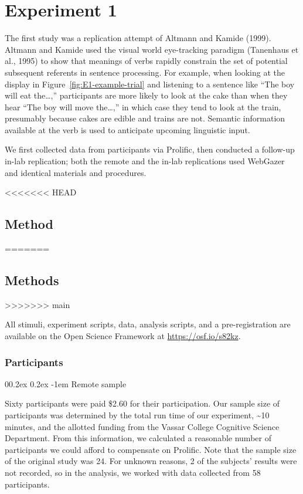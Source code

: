 \documentclass[
  man,floatsintext]{apa6}
\makeatletter
\let\oldparagraph\paragraph
\renewcommand{\paragraph}[1]{\oldparagraph{#1}\mbox{}}
\renewcommand{\paragraph}{\@startsection{paragraph}{4}{\parindent}%
  {0\baselineskip \@plus 0.2ex \@minus 0.2ex}%
  {-1em}%
  {\normalfont\normalsize\bfseries\itshape\typesectitle}}
\makeatother
\begin{document}
\section{Experiment 1}\label{experiment-1}

The first study was a replication attempt of
Altmann and Kamide (1999). Altmann and Kamide used the
visual world eye-tracking paradigm (Tanenhaus et al., 1995) to show that
meanings of verbs rapidly constrain the set of potential subsequent
referents in sentence processing. For example, when looking at the
display in Figure~\ref{fig:E1-example-trial} and listening to a sentence like
``The boy will eat the\ldots,'' participants are more likely to look at the cake than
when they hear ``The boy will move the\ldots,'' in which case they tend to look at the
train, presumably because cakes are edible and trains are not. Semantic
information available at the verb is used to anticipate upcoming
linguistic input.

We first collected data from participants via Prolific, then conducted a follow-up in-lab replication; both the remote and the in-lab replications used WebGazer and identical materials and procedures.

<<<<<<< HEAD
\subsection{Method}\label{method}
=======
\subsection{Methods}\label{methods}
>>>>>>> main

All stimuli, experiment scripts, data, analysis scripts, and a
pre-registration are available on the Open Science Framework at
\url{https://osf.io/s82kz}.

\subsubsection{Participants}\label{participants-1}

\paragraph{Remote sample}\label{remote-sample}

Sixty participants were paid \$2.60 for their participation. Our sample size
of participants was determined by the total run time of our experiment,
\textasciitilde10 minutes, and the allotted funding from the Vassar College Cognitive
Science Department. From this information, we calculated a reasonable
number of participants we could afford to compensate on Prolific. Note
that the sample size of the original study was 24. For unknown reasons,
2 of the subjects' results were not recorded, so in the analysis, we
worked with data collected from 58 participants.
\end{document}
